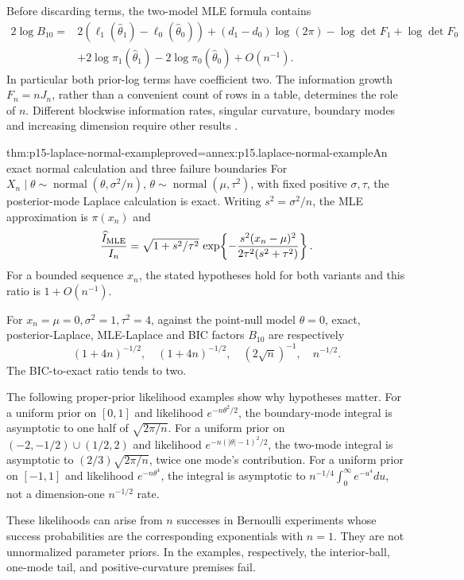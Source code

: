 Before discarding terms, the two-model MLE formula contains
\[
\begin{split}
2\log B_{10}={}&2(\ell_1(\widehat\theta_1)-\ell_0(\widehat\theta_0))
 +(d_1-d_0)\log(2\pi)-\log\det F_1+\log\det F_0\\
 &+2\log\pi_1(\widehat\theta_1)-2\log\pi_0(\widehat\theta_0)+O(n^{-1}).
\end{split}
\]
In particular both prior-log terms have coefficient two. The information
growth \(F_n=nJ_n\), rather than a convenient count of rows in a table,
determines the role of \(n\). Different blockwise information rates, singular
curvature, boundary modes and increasing dimension require other results
\cite[Sec.~4.1.3]{KassRaftery1995BayesFactors}.

\begin{hbtheorem}{thm:p15-laplace-normal-example}{proved=annex:p15.laplace-normal-example}{An exact normal calculation and three failure boundaries}
For \(X_n\mid\theta\sim\operatorname{normal}(\theta,\sigma^2/n)\),
\(\theta\sim\operatorname{normal}(\mu,\tau^2)\), with fixed positive
\(\sigma,\tau\), the posterior-mode Laplace calculation is exact.
Writing \(s^2=\sigma^2/n\), the MLE approximation is \(\pi(x_n)\) and
\[
 \frac{\widehat I_{\rm MLE}}{I_n}
 =\sqrt{1+s^2/\tau^2}\,
   \exp\!\left\{-\frac{s^2(x_n-\mu)^2}{2\tau^2(s^2+\tau^2)}\right\}.
\]
For a bounded sequence \(x_n\), the stated hypotheses hold for both
variants and this ratio is \(1+O(n^{-1})\).

For \(x_n=\mu=0,\sigma^2=1,\tau^2=4\), against the point-null model
\(\theta=0\), exact, posterior-Laplace, MLE-Laplace and BIC factors
\(B_{10}\) are respectively
\[
 (1+4n)^{-1/2},\quad(1+4n)^{-1/2},\quad(2\sqrt n)^{-1},\quad n^{-1/2}.
\]
The BIC-to-exact ratio tends to two.

The following proper-prior likelihood examples show why hypotheses matter.
For a uniform prior on \([0,1]\) and likelihood \(e^{-n\theta^2/2}\),
the boundary-mode integral is asymptotic to one half of
\(\sqrt{2\pi/n}\). For a uniform prior on
\((-2,-1/2)\cup(1/2,2)\) and likelihood
\(e^{-n(|\theta|-1)^2/2}\), the two-mode integral is asymptotic to
\((2/3)\sqrt{2\pi/n}\), twice one mode's contribution.
For a uniform prior on \([-1,1]\) and likelihood \(e^{-n\theta^4}\),
the integral is asymptotic to
\(n^{-1/4}\int_0^\infty e^{-u^4}du\), not a dimension-one
\(n^{-1/2}\) rate.
\end{hbtheorem}

These likelihoods can arise from \(n\) successes in Bernoulli experiments
whose success probabilities are the corresponding exponentials with \(n=1\).
They are not unnormalized parameter priors. In the examples, respectively,
the interior-ball, one-mode tail, and positive-curvature premises fail.

